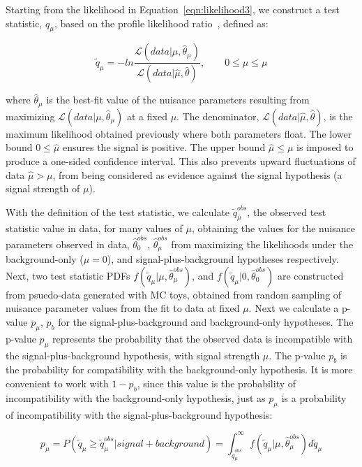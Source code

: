 Starting from the likelihood in Equation~\ref{eqn:likelihood3}, we construct a test statistic, $q_{\mu}$, based on the profile likelihood ratio~\cite{AsymptoticLimits},
defined as:

\begin{equation}
\label{eqn:test_stat}
\tilde{q}_{\mu} = -ln \frac{\mathcal{L}(data|\mu,\hat{\theta}_{\mu})}{\mathcal{L}(data|\hat{\mu},\hat{\theta})},~~~~~~~~~0 \leq \hat{\mu} \leq{\mu}
\end{equation}

\noindent where $\hat{\theta}_{\mu}$ is the best-fit value of the nuisance parameters resulting from maximizing $\mathcal{L}(data|\mu,\hat{\theta}_{\mu})$ at a fixed $\mu$. 
The denominator, $\mathcal{L}(data|\hat{\mu},\hat{\theta})$, is the maximum likelihood obtained
previously where both parameters float. The lower bound $0 \leq \hat{\mu}$ ensures the signal is positive.
The upper bound $\hat{\mu} \leq \mu$ is imposed to produce a one-sided confidence interval. This also prevents upward fluctuations of data $\hat{\mu} > \mu$, 
from being considered as evidence against the signal hypothesis (a signal strength of $\mu$).

With the definition of the test statistic, we calculate $\tilde{q}_{\mu}^{obs}$, the observed test statistic value in data,
for many values of $\mu$, obtaining the values for the nuisance parameters observed in data, $\hat{\theta}_{0}^{obs}$, $\hat{\theta}_{\mu}^{obs}$
from maximizing the likelihoods under the background-only ($\mu=0$), and signal-plus-background hypotheses respectively.
Next, two test statistic PDFs
$f(\tilde{q}_{\mu}|\mu,\hat{\theta}_{\mu}^{obs})$, and $f(\tilde{q}_{\mu}|0,\hat{\theta}_{0}^{obs})$ are constructed from psuedo-data
generated with MC toys, obtained from random sampling of nuisance parameter values from the fit to data at fixed $\mu$.  Next we calculate a p-value $p_{\mu}$, $p_{b}$
for the signal-plus-background and background-only hypotheses. The p-value $p_{\mu}$ represents the probability that the observed data is incompatible with the
signal-plus-background hypothesis, with signal strength $\mu$.
The p-value $p_{b}$ is the probability for compatibility with the background-only hypothesis.
It is more convenient to work with $1-p_{b}$, since this value is the probability of incompatibility with the background-only hypothesis,
just as $p_{\mu}$ is a probability of incompatibility with the signal-plus-background hypothesis:

\begin{equation}
\label{eqn:pvalues1}
p_{\mu} = P(\tilde{q}_{\mu} \geq \tilde{q}_{\mu}^{obs}|signal+background) = \int_{\tilde{q}_{\mu}^{obs}}^{\infty} f(\tilde{q}_{\mu}|\mu,\hat{\theta}_{\mu}^{obs}) d\tilde{q}_{\mu}
\end{equation}

